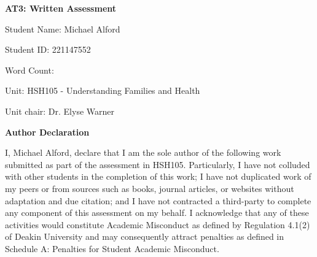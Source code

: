 \begin{titlepage}
  \begin{center}
    \textbf{AT3: Written Assessment}
    
    \vspace{1.0cm}
    
    Student Name: Michael Alford
    
    \vspace{1.0cm}
    
    Student ID: 221147552
    
    \vspace{1.0cm}
    
    Word Count: 
    
    \vspace{1.0cm}
    
    Unit: HSH105 - Understanding Families and Health
    
    \vspace{1.0cm}
    
    Unit chair: Dr. Elyse Warner

    \vfill

    \textbf{Author Declaration}

    I, Michael Alford, declare that I am the sole author of the following work submitted as part of the assessment  in  HSH105.  Particularly,  I  have  not  colluded  with  other  students  in  the  completion  of this work; I have not duplicated work     of my peers or from sources such as books, journal articles, or websites  without  adaptation  and  due  citation;  and  I  have  not  contracted  a  third-party  to  complete any  component  of  this  assessment  on  my  behalf.  I  acknowledge that any  of  these  activities  would constitute  Academic  Misconduct  as  defined  by  Regulation  4.1(2)  of  Deakin  University  and  may consequently attract penalties as defined in Schedule A: Penalties for Student Academic Misconduct.
    
  \end{center}
\end{titlepage}